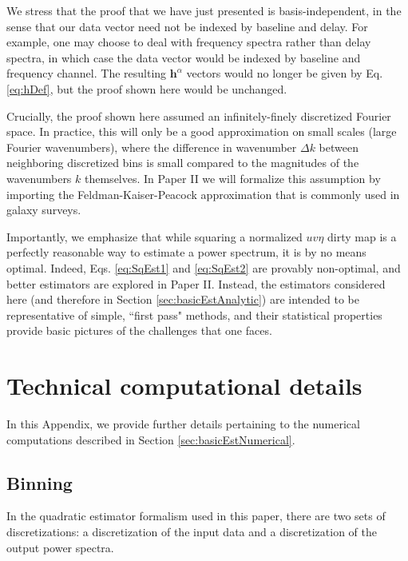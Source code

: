 \documentclass[twocolumn,aps,prd,nofootinbib,showpacs]{revtex4-1}
\begin{document}
We stress that the proof that we have just presented is basis-independent, in the sense that our data vector need not be indexed by baseline and delay.  For example, one may choose to deal with frequency spectra rather than delay spectra, in which case the data vector would be indexed by baseline and frequency channel.  The resulting $\mathbf{h}^\alpha$ vectors would no longer be given by  Eq. \eqref{eq:hDef}, but the proof shown here would be unchanged.

Crucially, the proof shown here assumed an infinitely-finely discretized Fourier space.  In practice, this will only be a good approximation on small scales (large Fourier wavenumbers), where the difference in wavenumber $\Delta k$ between neighboring discretized bins is small compared to the magnitudes of the wavenumbers $k$ themselves.  In Paper II we will formalize this assumption by importing the Feldman-Kaiser-Peacock approximation that is commonly used in galaxy surveys.

Importantly, we emphasize that while squaring a normalized $uv\eta$ dirty map is a perfectly reasonable way to estimate a power spectrum, it is by no means optimal.  Indeed,  Eqs. \eqref{eq:SqEst1} and \eqref{eq:SqEst2} are provably non-optimal, and better estimators are explored in Paper II.  Instead, the estimators considered here (and therefore in Section \ref{sec:basicEstAnalytic}) are intended to be representative of simple, ``first pass" methods, and their statistical properties provide basic pictures of the challenges that one faces.

\section{Technical computational details}
\label{appendix:Computational}

In this Appendix, we provide further details pertaining to the numerical computations described in Section \ref{sec:basicEstNumerical}.

\subsection{Binning}
In the quadratic estimator formalism used in this paper, there are two sets of discretizations: a discretization of the input data and a discretization of the output power spectra.
\end{document}
